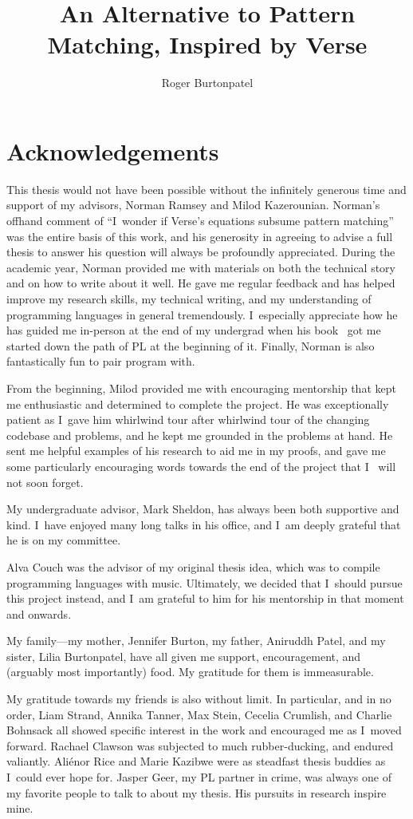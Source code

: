 \documentclass[manuscript,screen, 12pt, nonacm]{acmart}
\title{An Alternative to Pattern Matching, Inspired by Verse}
\author{Roger Burtonpatel}
\affiliation{%
\institution{Tufts University}
\streetaddress{419 Boston Ave}
  \city{Medford}
  \state{Massachusetts}
  \country{USA}
  \postcode{02155}
  }
\begin{document}
\section{Acknowledgements}

This thesis would not have been possible without the infinitely generous time
and support of my advisors, Norman Ramsey and Milod Kazerounian. Norman's
offhand comment of “I~wonder if Verse's equations subsume pattern matching” was
the entire basis of this work, and his generosity in agreeing to advise a full
thesis to answer his question will always be profoundly appreciated. During the
academic year, Norman provided me with materials on both the technical story and
on how to write about it well. He gave me regular feedback and has helped
improve my research skills, my technical writing, and my understanding of
programming languages in general tremendously. I~especially appreciate how he
has guided me in-person at the end of my undergrad when his book~\citep{bpc} got
me started down the path of PL at the beginning of it. Finally, Norman is also
fantastically fun to pair program with. 

From the beginning, Milod provided me with encouraging mentorship that kept
me enthusiastic and determined to complete the project. He was exceptionally
patient as I~gave him whirlwind tour after whirlwind tour of the changing
codebase and problems, and he kept me grounded in the problems at hand. He 
sent me helpful examples of his research to aid me in my proofs, and gave me
some particularly encouraging words towards the end of the project that I~
will not soon forget. 

My undergraduate advisor, Mark Sheldon, has always been both supportive and
kind. I~have enjoyed many long talks in his office, and I~am deeply grateful
that he is on my committee. 

Alva Couch was the advisor of my original thesis idea, which was to compile
programming languages with music. Ultimately, we decided that I~should pursue
this project instead, and I~am grateful to him for his mentorship in that moment
and onwards. 

My family---my mother, Jennifer Burton, my father, Aniruddh Patel, and my
sister, Lilia Burtonpatel, have all given me support, encouragement, and
(arguably most importantly) food. My gratitude for them is immeasurable. 

My gratitude towards my friends is also without limit. In particular, and in
no order, Liam Strand, Annika Tanner, Max Stein, Cecelia Crumlish, and
Charlie Bohnsack all showed specific interest in the work and encouraged me
as I~moved forward. Rachael Clawson was subjected to much rubber-ducking,
and endured valiantly. Aliénor Rice and Marie Kazibwe were as steadfast
thesis buddies as I~could ever hope for. Jasper Geer, my PL partner in
crime, was always one of my favorite people to talk to about my thesis. His
pursuits in research inspire mine. 
\end{document}
